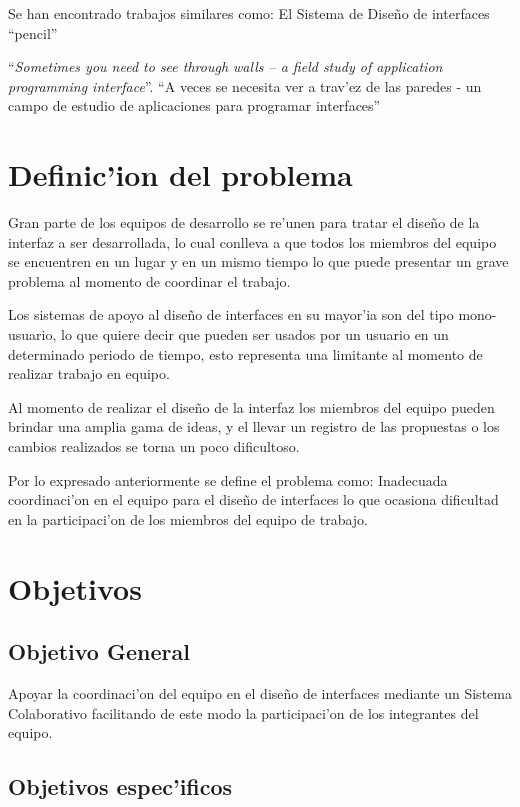 \medskip
Se han encontrado trabajos similares como: El Sistema de Dise\~no de interfaces ``pencil'' \cite{pencil2010}
  
``\textit{Sometimes you need to see through walls – a field study of application programming interface}''. ``A veces se necesita ver a trav'ez de las paredes - un campo de estudio de aplicaciones para programar interfaces'' \cite{de2004sometimes}

\section{Definic'ion del problema}

Gran parte de los equipos de desarrollo se re'unen para tratar el dise\~no de la interfaz a ser desarrollada, lo cual conlleva a que todos los miembros del equipo se encuentren en un lugar y en un mismo tiempo lo que puede presentar un grave problema al momento de coordinar el trabajo. 

\medskip

Los sistemas de apoyo al dise\~no de interfaces en su mayor'ia son del tipo mono-usuario, lo que quiere decir que pueden ser usados por un usuario en un determinado periodo de tiempo, esto representa una limitante al momento de realizar trabajo en equipo.

Al momento de realizar el dise\~no de la interfaz los miembros del equipo pueden brindar una amplia gama de ideas, y el llevar un registro de las propuestas o los cambios realizados se torna un poco dificultoso.

\medskip

Por  lo expresado anteriormente se define el problema como:
Inadecuada coordinaci'on en el equipo para el dise\~no de interfaces lo que ocasiona dificultad en la participaci'on de los miembros del equipo de trabajo.


\section{Objetivos}

\subsection{Objetivo General}

Apoyar la coordinaci'on del equipo en el dise\~no de interfaces mediante un Sistema Colaborativo facilitando de este modo la participaci'on de los integrantes del equipo.

\subsection{Objetivos espec'ificos}

